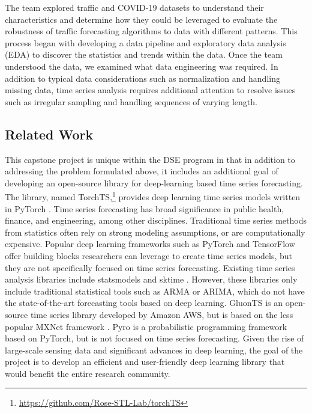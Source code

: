 \documentclass{article}
\begin{document}
The team explored traffic and COVID-19 datasets to understand their characteristics and determine how they could be leveraged to evaluate the robustness of traffic forecasting algorithms to data with different patterns. This process began with developing a data pipeline and exploratory data analysis (EDA) to discover the statistics and trends within the data. Once the team understood the data, we examined what data engineering was required. In addition to typical data considerations such as normalization and handling missing data, time series analysis requires additional attention to resolve issues such as irregular sampling and handling sequences of varying length.

\subsection{Related Work}

This capstone project is unique within the DSE program in that in addition to addressing the problem formulated above, it includes an additional goal of developing an open-source library for deep-learning based time series forecasting. The library, named TorchTS,\footnote{\url{https://github.com/Rose-STL-Lab/torchTS}} provides deep learning time series models written in PyTorch \cite{paszke2019pytorch}. Time series forecasting has broad significance in public health, finance, and engineering, among other disciplines. Traditional time series methods from statistics often rely on strong modeling assumptions, or are computationally expensive. Popular deep learning frameworks such as PyTorch and TensorFlow \cite{abadi2015tensorflow} offer building blocks researchers can leverage to create time series models, but they are not specifically focused on time series forecasting. Existing time series analysis libraries include statsmodels \cite{seabold2010statsmodels} and sktime \cite{loning2019sktime}. However, these libraries only include traditional statistical tools such as ARMA or ARIMA, which do not have the state-of-the-art forecasting tools based on deep learning. GluonTS \cite{alexandrov2019gluonts, alexandrov2020gluonts} is an open-source time series library developed by Amazon AWS, but is based on the less popular MXNet framework \cite{chen2015mxnet}. Pyro \cite{bingham2019pyro} is a probabilistic programming framework based on PyTorch, but is not focused on time series forecasting. Given the rise of large-scale sensing data and significant advances in deep learning, the goal of the project is to develop an efficient and user-friendly deep learning library that would benefit the entire research community.
\end{document}

